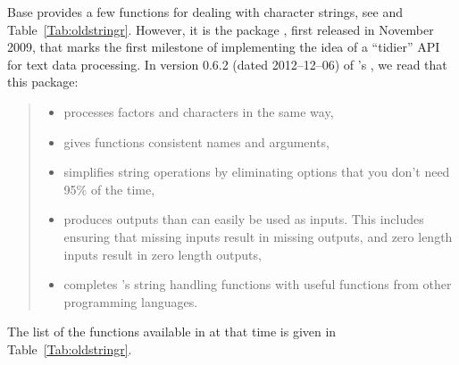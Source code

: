 \documentclass[nojss]{jss}
\begin{document}
Base  \citep{Rproject:home} provides a few functions for dealing
with character strings, see \citep[Chapter~8]{Chambers2008:SoftDA}
and Table~\ref{Tab:oldstringr}.
However, it is the   package \citep{Wickham2010:stringr},
first released in November 2009, that marks the first milestone of implementing
the idea of a ``tidier'' API for text data processing.
In version 0.6.2 (dated 2012--12--06)
of 's , we read that this package:
\begin{quote}\it
\begin{itemize}
\item        processes factors and characters in the same way,
\item        gives functions consistent names and arguments,
\item        simplifies string operations by eliminating options that you don't need 95\% of the time,
\item        produces outputs than can easily be used as inputs. This includes ensuring that missing inputs result in missing outputs, and zero length inputs result in zero length outputs,
\item        completes 's string handling functions with useful functions from other programming languages.
\end{itemize}
\end{quote}
The list of the functions available in  at that time
is given in Table~\ref{Tab:oldstringr}.
\end{document}
